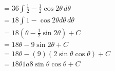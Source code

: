 \documentclass[preview]{standalone}
\begin{document}
\begin{align*}
&=36 \int \frac{1}{2} - \frac{1}{2}\cos2\theta \, d\theta \\ &=18 \int 1-\cos2\theta d\theta \, d\theta \\ &=18(\theta-\frac{1}{2}\sin2\theta) + C \\ &=18\theta-9\sin2\theta +C \\ &=18\theta-(9)(2\sin\theta\cos\theta) + C \\ &=18\theta1a8\sin\theta\cos\theta +C
\end{align*}
\end{document}

